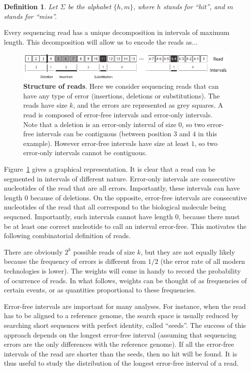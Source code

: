 \documentclass{article}
\newtheorem{definition}{Definition}
\begin{document}
\begin{definition}
\label{def:symbols}
Let $\Sigma$ be the alphabet $\{h, m\}$, where $h$ stands for
``hit'', and $m$ stands for ``miss''.
\end{definition}

Every sequencing read has a unique decomposition in intervals of maximum
length. This decomposition will allow us to encode the reads as...

\begin{figure}[h]
\centering
\includegraphics[scale=0.88]{sketch_seeding.pdf}
\caption{\textbf{Structure of reads}. Here we consider sequencing reads
that can have any type of error (insertions, deletions or substitutions).
The reads have size $k$, and the errors are represented as grey squares. A
read is composed of error-free intervals and error-only intervals. Note
that a deletion is an error-only interval of size $0$, so two error-free
intervals can be contiguous (between position $3$ and $4$ in this
example). However error-free intervals have size at least $1$, so two
error-only intervals cannot be contiguous.}
\label{fig:sketchseed}
\end{figure}

Figure~\ref{fig:sketchseed} gives a graphical representation.  It is clear
that a read can be segmented in intervals of different nature.  Error-only
intervals are consecutive nucleotides of the read that are all errors.
Importantly, these intervals can have length $0$ because of deletions. On
the opposite, error-free intervals are consecutive nucleotides of the read
that all correspond to the biological molecule being sequcned.
Importantly, such intervals cannot have length $0$, because there must be
at least one correct nucleotide to call an interval error-free. This
motivates the following combinatorial definition of reads.

There are obviously $2^k$ possible reads of size $k$, but they are not
equally likely because the frequency of errors is different from $1/2$
(the error rate of all modern technologies is lower). The weights will
come in handy to record the probability of ocurrence of reads. In what
follows, weights can be thought of as frequencies of certain events, or as
quantities proportional to these frequencies.

Error-free intervals are important for many analyses. For instance, when
the read has to be aligned to a reference genome, the search space is
usually reduced by searching short sequences with perfect identity, called
``seeds''. The success of this approach depends on the longest error-free
interval (assuming that sequencing errors are the only differences with
the reference genome). If all the error-free intervals of the read are
shorter than the seeds, then no hit will be found. It is thus useful to
study the distribution of the longest error-free interval of a read.
\end{document}
